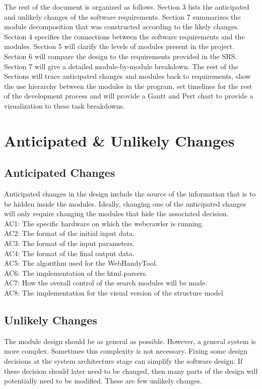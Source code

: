 \documentclass[titlepage]{article}
\begin{document}
The rest of the document is organized as follows. Section 3 lists the anticipated and unlikely changes of the software requirements. Section 7 summarizes the module decomposition that was constructed according to the likely changes. Section 4 specifies the connections between the software requirements and the modules. Section 5 will clarify the levels of modules present in the project. Section 6 will compare the design to the requirements provided in the SRS. Section 7 will give a detailed module-by-module breakdown. The rest of the Sections  will trace anticipated changes and modules back to requirements, show the use hierarchy between the modules in the program, set timelines for the rest of the development process and will provide a Gantt and Pert chart to provide a visualization to these task breakdowns.


\section{Anticipated \& Unlikely Changes}
\subsection{Anticipated Changes}
Anticipated changes in the design include the source of the information that is to be hidden inside the modules. Ideally, changing one of the anticipated changes will only require changing the modules that hide the associated decision.\\

\noindent
AC1: The specific hardware on which the webcrawler is running.\\
AC2: The format of the initial input data.\\
AC3: The format of the input parameters.\\
AC4: The format of the final output data.\\
AC5: The algorithm used for the WebHandyTool.\\
AC6: The implementation of the html parsers.\\
AC7: How the overall control of the search modules will be made.\\
AC8: The implementation for the visual version of the structure model\\



\subsection{Unlikely Changes}
The module design should be as general as possible. However, a general system is more complex. Sometimes this complexity is not necessary. Fixing some design decisions at the system architecture stage can simplify the software design. If these decision should later need to be changed, then many parts of the design will potentially need to be modified.
These are few unlikely changes.\\
\end{document}

